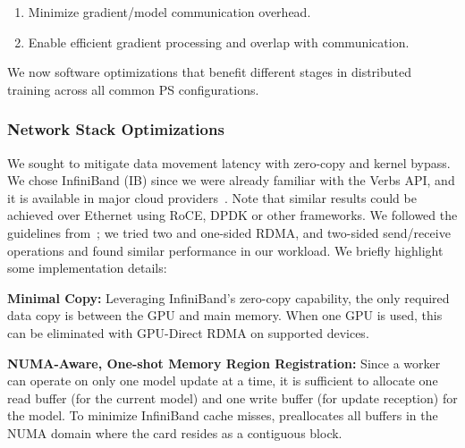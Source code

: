 \begin{enumerate}[noitemsep,topsep=0pt,parsep=0pt,partopsep=0pt]
\item Minimize gradient/model communication overhead.
\item Enable efficient gradient processing and overlap with communication.
\end{enumerate}

We now software optimizations that benefit different stages in distributed training across all common PS configurations. %

\subsubsection{Network Stack Optimizations}
\label{sec:IBOptimization}
We sought to mitigate data movement latency with zero-copy and kernel bypass. We chose InfiniBand (IB) since we were already familiar with the Verbs API, and it is available in major cloud providers~\cite{AzureWin5:online}. Note that similar results could be achieved over Ethernet using RoCE, DPDK or other frameworks. We followed the guidelines from~\cite{rdma}; we tried two and one-sided RDMA, and two-sided send/receive operations and found similar performance in our workload. We briefly highlight some implementation details:

\noindent \textbf{Minimal Copy:} Leveraging InfiniBand's zero-copy capability, the only required data copy is between the GPU and main memory. When one GPU is used, this can be eliminated with GPU-Direct RDMA on supported devices.

\noindent \textbf{NUMA-Aware, One-shot Memory Region Registration:} Since a worker can operate on only one model update at a time, it is sufficient to allocate one read buffer (for the current model) and one write buffer (for update reception) for the model. To minimize InfiniBand cache misses, \phub preallocates all buffers in the NUMA domain where the card resides as a contiguous block.

